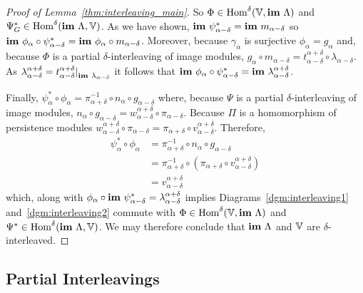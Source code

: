 \begin{proof}[Proof of Lemma~\ref{thm:interleaving_main}]
  So $\Phi\in\mathrm{Hom}^\delta(\mathbb{V},\mathbf{im}~\Lambda)$ and $\Psi_G^*\in\mathrm{Hom}^\delta(\mathbf{im}~\Lambda,\mathbb{V})$.
  As we have shown, $\mathbf{im}~\psi_{\alpha-\delta}^* = \mathbf{im}~m_{\alpha-\delta}$ so $\mathbf{im}~\phi_\alpha\circ\psi_{\alpha-\delta}^* = \mathbf{im}~\phi_\alpha\circ m_{\alpha-\delta}$.
  Moreover, because $\gamma_\alpha$ is surjective $\phi_\alpha = g_\alpha$ and, because $\Phi$ is a partial $\delta$-interleaving of image modules, $g_\alpha\circ m_{\alpha-\delta} = t_{\alpha-\delta}^{\alpha+\delta}\circ \lambda_{\alpha-\delta}$.
  As $\lambda_{\alpha-\delta}^{\alpha+\delta} = t_{\alpha-\delta}^{\alpha+\delta}\mathord{\mid}_{\mathbf{im}~\lambda_{\alpha-\delta}}$ it follows that $\mathbf{im}~\phi_\alpha\circ\psi_{\alpha-\delta}^* = \mathbf{im}~\lambda_{\alpha-\delta}^{\alpha+\delta}$.

  Finally, $\psi_\alpha^*\circ\phi_\alpha = \pi_{\alpha+\delta}^{-1}\circ n_\alpha\circ g_{\alpha-\delta}$ where, because $\Psi$ is a partial $\delta$-interleaving of image modules, $n_\alpha\circ g_{\alpha-\delta} = w_{\alpha-\delta}^{\alpha+\delta}\circ\pi_{\alpha-\delta}$.
  Because $\Pi$ is a homomorphism of persistence modules $w_{\alpha-\delta}^{\alpha+\delta}\circ \pi_{\alpha-\delta} = \pi_{\alpha+\delta}\circ v_{\alpha-\delta}^{\alpha+\delta}$.
  Therefore,
  \begin{align*}
    \psi_\alpha^*\circ\phi_\alpha &= \pi_{\alpha+\delta}^{-1}\circ n_\alpha\circ g_{\alpha-\delta}\\
      &= \pi_{\alpha+\delta}^{-1}\circ (\pi_{\alpha+\delta}\circ v_{\alpha-\delta}^{\alpha+\delta})\\
      &= v_{\alpha-\delta}^{\alpha+\delta}
  \end{align*}
  which, along with $\phi_\alpha\circ\mathbf{im}~\psi_{\alpha-\delta}^* = \lambda_{\alpha-\delta}^{\alpha+\delta}$ implies Diagrams~\ref{dgm:interleaving1} and~\ref{dgm:interleaving2} commute with $\Phi\in\mathrm{Hom}^\delta(\mathbb{V},\mathbf{im}~\Lambda)$ and $\Psi^*\in\mathrm{Hom}^\delta(\mathbf{im}~\Lambda, \mathbb{V})$.
  We may therefore conclude that $\mathbf{im}~\Lambda$ and $\mathbb{V}$ are $\delta$-interleaved.
\end{proof}

\subsection{Partial Interleavings}

